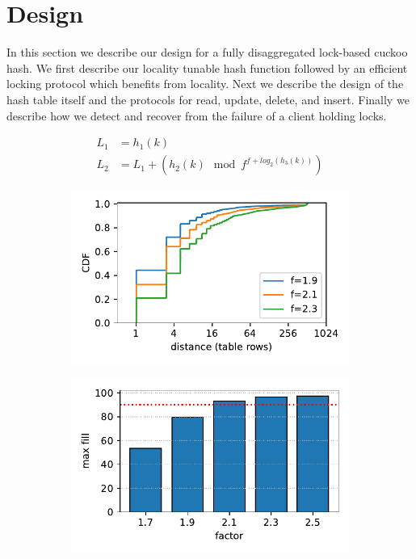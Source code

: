 \section{Design}

In this section we describe our design for a fully
disaggregated lock-based cuckoo hash. We first describe our
locality tunable hash function followed by an efficient
locking protocol which benefits from locality. Next we
describe the design of the hash table itself and the
protocols for read, update, delete, and insert. Finally we
describe how we detect and recover from the failure of a
client holding locks.


\label{sec:design}

\begin{figure}[t]
    \centering
    \begin{subfigure}{0.3\linewidth}
        \begin{align*}
            L_1 &= h_1(k) \\
            L_2 &= L_1 + (h_2(k)\mod f^{f + log_2(h_3(k))})
        \end{align*}
    \end{subfigure}
    \begin{subfigure}{0.3\linewidth}
        \includegraphics[width=0.99\linewidth]{fig/hash_factor.pdf}
    \end{subfigure}
    \begin{subfigure}{0.3\linewidth}
        \includegraphics[width=0.99\linewidth]{fig/hash_fill.pdf}

\end{subfigure}
\end{figure}
